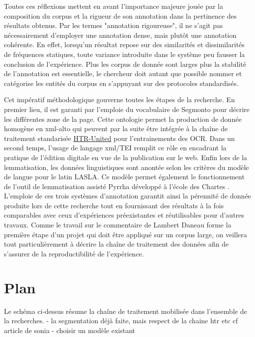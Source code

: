 \documentclass[11pt,french]{article}
\begin{document}
Toutes ces réflexions mettent en avant l'importance majeure jouée par la composition du corpus et la rigueur de son annotation dans la pertinence des résultats obtenus. Par les termes "annotation rigoureuse", il ne s'agit pas nécessairement d'employer une annotation dense, mais plutôt une annotation cohérente. En effet, lorsqu'un résultat repose sur des similarités et dissimilarités de fréquences statiques, toute variance introduite dans le système peu fausser la conclusion de l'expérience. Plus les corpus de donnée sont larges plus la stabilité de l'annotation est essentielle, le chercheur doit autant que possible nommer et catégorise les entités du corpus en s'appuyant sur des protocoles standardisés.\par

Cet impératif méthodologique gouverne toutes les étapes de la recherche. En premier lieu, il est garanti par l'emploie du vocabulaire de Segmonto \cite{SegmOnto} pour décrire les différentes zone de la page. Cette ontologie permet la production de donnée homogène en xml-alto qui peuvent par la suite être intégrée à la chaîne de traitement standarisée \href{https://htr-united.github.io/index.html}{HTR-United} pour l'entrainements des OCR. Dans un second temps, l'usage de langage xml/TEI remplit ce rôle en encadrant la pratique de l'édition digitale en vue de la publication sur le web. Enfin lors de la lemmatisation, les données linguistiques sont anontée selon les critères du modèle de langue pour le latin LASLA. Ce modèle permet également le fonctionnement de l'outil de lemmatisation assisté Pyrrha développé à l'école des Chartes \cite{clericeBuildingInfrastructureAnnotating2022}. L'emploie de ces trois systèmes d'annotation garantit ainsi la pérennité de donnée produite lors de cette recherche tout en fournissant des résultats à la fois comparables avec ceux d'expériences préexistantes et réutilisables pour d'autres travaux. Comme le travail sur le commentaire de Lambert Daneau forme la première étape d'un projet qui doit être appliqué sur un corpus large, on veillera tout particulièrement à décrire la chaîne de traitement des données afin de s'assurer de la reproductibilité de l'expérience.\par
\FloatBarrier
\section{Plan}
Le schéma ci-dessus résume la chaîne de traitement mobilisée dans l'ensemble de la recherches. 
- la segmentation déjà faite, mais respect de la chaine htr etc cf article de sonia 
- choisir un modèle existant \cite{humeau_2024_10602197} 
\end{document}
